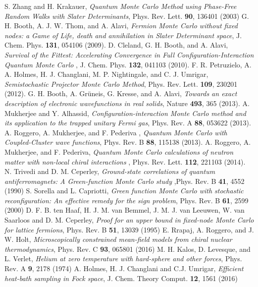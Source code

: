 \begin{thebibliography}{99.}
S. Zhang and H. Krakauer, \emph{Quantum Monte Carlo Method using Phase-Free Random Walks with Slater Determinants}, Phys. Rev. Lett. {\bf 90}, 136401 (2003)
G. H. Booth, A. J. W. Thom, and A. Alavi, \emph{Fermion Monte Carlo without fixed nodes: a Game of Life, death and annihilation in Slater Determinant space}, J. Chem. Phys. {\bf 131}, 054106 (2009).
D. Cleland, G. H. Booth, and A. Alavi, \emph{ Survival of the Fittest: Accelerating Convergence in Full Configuration-Interaction Quantum Monte Carlo },  J. Chem. Phys. {\bf 132}, 041103 (2010).
F. R. Petruzielo, A. A. Holmes, H. J. Changlani, M. P.
Nightingale, and C. J. Umrigar, \emph{Semistochastic Projector Monte Carlo Method}, Phys. Rev. Lett. {\bf 109},
230201 (2012).
G. H. Booth, A. Gr\"uneis, G. Kresse, and A. Alavi,\emph{ Towards an exact description of electronic wavefunctions in real solids}, Nature
{\bf 493}, 365 (2013).
A. Mukherjee and Y. Alhassid, \emph{Configuration-interaction Monte Carlo method and its application to the trapped unitary Fermi gas},
 Phys. Rev. A {\bf 88}, 053622 (2013).
A. Roggero, A. Mukherjee, and F. Pederiva , \emph{Quantum Monte Carlo with Coupled-Cluster wave functions},
 Phys. Rev. B {\bf 88}, 115138 (2013).
A. Roggero, A. Mukherjee, and F. Pederiva, \emph{Quantum Monte Carlo calculations of neutron matter with non-local chiral interactions },
 Phys. Rev. Lett. {\bf 112}, 221103 (2014).
N. Trivedi and D. M. Ceperley, \emph{Ground-state correlations of quantum antiferromagnets: A Green-function Monte Carlo study} ,Phys. Rev. B {\bf 41}, 4552 (1990)
S. Sorella and L. Capriotti, \emph{Green function Monte Carlo with stochastic reconfiguration: An effective remedy for the sign problem}, Phys. Rev. B {\bf 61}, 2599 (2000)
D. F. B. ten Haaf, H. J. M. van Bemmel, J. M. J. van Leeuwen, W. van Saarloos and D. M. Ceperley, \emph{Proof for an upper bound in fixed-node Monte Carlo for lattice fermions}, Phys. Rev. B {\bf 51}, 13039 (1995)
E. Rrapaj, A. Roggero, and J. W. Holt, \emph{Microscopically constrained mean-field models from chiral nuclear thermodynamics}, Phys. Rev. C {\bf 93}, 065801 (2016)
M. H. Kalos, D. Levesque, and L. Verlet, \emph{Helium at zero temperature with hard-sphere and other forces}, Phys. Rev. A {\bf 9}, 2178 (1974)
A. Holmes, H. J. Changlani and C.J. Umrigar, \emph{Efficient heat-bath sampling in Fock space}, J. Chem. Theory Comput. {\bf 12}, 1561 (2016) 

\end{thebibliography}
